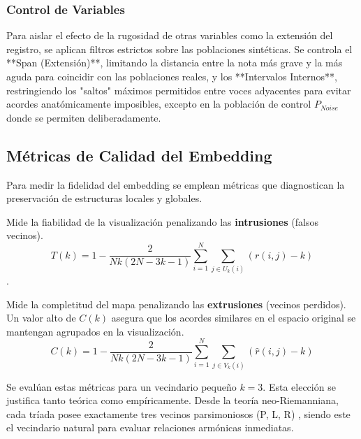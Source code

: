 \subsubsection{Control de Variables}
Para aislar el efecto de la rugosidad de otras variables como la extensión del registro, se aplican filtros estrictos sobre las poblaciones sintéticas. Se controla el **Span (Extensión)**, limitando la distancia entre la nota más grave y la más aguda para coincidir con las poblaciones reales, y los **Intervalos Internos**, restringiendo los "saltos" máximos permitidos entre voces adyacentes para evitar acordes anatómicamente imposibles, excepto en la población de control $P_{Noise}$ donde se permiten deliberadamente.

\subsection{Métricas de Calidad del Embedding}
\label{sec:evaluacion}

Para medir la fidelidad del embedding se emplean métricas que diagnostican la preservación de estructuras locales y globales.

\begin{definition}[Trustworthiness]
Mide la fiabilidad de la visualización penalizando las \textbf{intrusiones} (falsos vecinos).
\begin{equation}
T(k) = 1 - \frac{2}{Nk(2N - 3k - 1)} \sum_{i=1}^{N} \sum_{j \in U_k(i)} (r(i,j) - k)
\end{equation}
\cite{Venna2006}.
\end{definition}

\begin{definition}[Continuity]
Mide la completitud del mapa penalizando las \textbf{extrusiones} (vecinos perdidos). Un valor alto de $C(k)$ asegura que los acordes similares en el espacio original se mantengan agrupados en la visualización.
\begin{equation}
C(k) = 1 - \frac{2}{Nk(2N - 3k - 1)} \sum_{i=1}^{N} \sum_{j \in V_k(i)} (\hat{r}(i,j) - k)
\end{equation}
\end{definition}

Se evalúan estas métricas para un vecindario pequeño $k=3$. Esta elección se justifica tanto teórica como empíricamente. Desde la teoría neo-Riemanniana, cada tríada posee exactamente tres vecinos parsimoniosos (P, L, R) \cite{tymoczkoGeometryMusicHarmony2011}, siendo este el vecindario natural para evaluar relaciones armónicas inmediatas.

